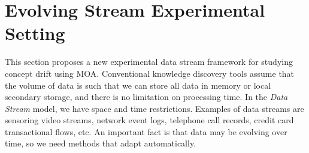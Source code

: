 \section{Evolving Stream Experimental Setting}
\label{sec:expsetting}
This section proposes a new experimental data stream framework for
studying concept drift using MOA. %
%
\BEGINOMIT
Conventional knowledge discovery tools assume that the volume of data is such 
that we can store all data in memory or local secondary storage, and there is no limitation on processing time. 
In the {\em Data Stream} model, we have space and time restrictions. Examples of data 
streams are sensoring video streams, network event logs, telephone call records,
credit card transactional flows, etc. 
An important fact is that data may be evolving over time, so we need methods
that adapt automatically. 

